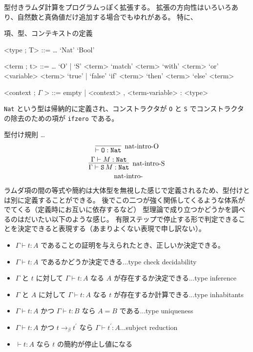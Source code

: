 型付きラムダ計算をプログラムっぽく拡張する。
拡張の方向性はいろいろあり、自然数と真偽値だけ追加する場合でもゆれがある。
特に、 
\begin{itembox}[l]{項、型、コンテキストの定義}
\begin{grammar}
  <type ; T> ::= \ldots
  \alt `Nat'
  \alt `Bool'

  <term ; t> ::= \ldots
  \alt `O' | `S' <term>
  \alt `match' <term> `with' <term> `or' <variable> <term>
  \alt `true' | `false'
  \alt `if' <term> `then' <term> `else' <term>

  <context ; \(\Gamma\) > ::= empty | <context> ,  <term-variable> : <type>
\end{grammar}
\end{itembox}

\texttt{Nat} という型は帰納的に定義され、コンストラクタが \texttt{O} と \texttt{S} でコンストラクタの除去のための項が \texttt{ifzero} である。

\begin{itembox}[l]{型付け規則}
  \ldots
  \[\infer[\text{nat-intro-O}]{\vdash \texttt{O} : \texttt{Nat}}{}\]
  \[\infer[\text{nat-intro-S}]{\Gamma \vdash \texttt{S} \, M : \texttt{Nat}}{\Gamma \vdash M : \texttt{Nat}}\]
  \[\infer[\text{nat-intro-}]{}{}\]
\end{itembox}

ラムダ項の間の等式や簡約は大体型を無視した感じで定義されるため、型付けとは別に定義することができる。
後でこの二つが強く関係してくるような体系がでてくる（定義時にお互いに依存するなど）
型理論で成り立つかどうかを調べるのはだいたい以下のような感じ。
有限ステップで停止する形で判定できることを決定できると表現する（あまりよくない表現で申し訳ない）。

\begin{itemize}
  \item \(\Gamma \vdash t : A\) であることの証明を与えられたとき、正しいか決定できる。
  \item \(\Gamma \vdash t : A\) であるかどうか決定できる...type check decidability
  \item \(\Gamma\) と \(t\) に対して \(\Gamma \vdash t : A\) なる \(A\) が存在するか決定できる...type inference
  \item \(\Gamma\) と \(A\) に対して \(\Gamma \vdash t : A\) なる \(t\) が存在するか計算できる...type inhabitants
  \item \(\Gamma \vdash t : A\) かつ \(\Gamma \vdash t : B\) なら \(A = B\) である...type uniqueness
  \item \(\Gamma \vdash t : A\) かつ \(t \rightarrow_{\beta} t^{\prime}\) なら \(\Gamma \vdash t^{\prime} : A\)...subject reduction
  \item \(\vdash t : A\) なら \(t\) の簡約が停止し値になる
\end{itemize}